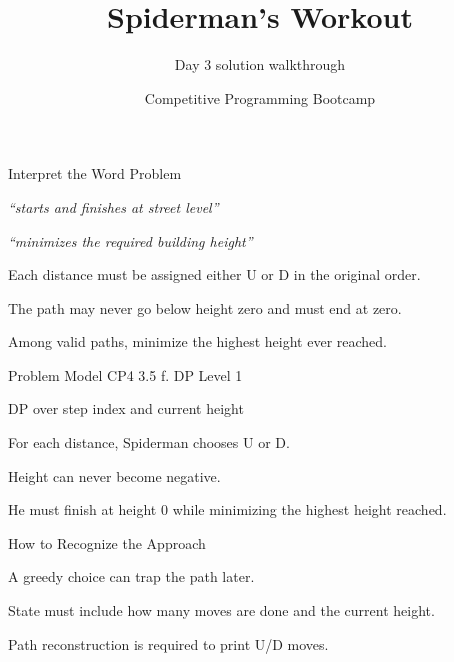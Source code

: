\documentclass[aspectratio=169,11pt]{beamer}
\title[spiderman]{Spiderman's Workout}
\subtitle{Day 3 solution walkthrough}
\author[Solution Deck]{Competitive Programming Bootcamp}
\date{}
\begin{document}
\begin{frame}[plain]
  \titlepage
\end{frame}

\begin{frame}{Interpret the Word Problem}
\small
{}
\begin{tightitemize}
  \item \textit{``starts and finishes at street level''}
  \item \textit{``minimizes the required building height''}
\end{tightitemize}

\vspace{0.18cm}
\begin{tightitemize}
  \item Each distance must be assigned either U or D in the original order.
  \item The path may never go below height zero and must end at zero.
  \item Among valid paths, minimize the highest height ever reached.
\end{tightitemize}
\end{frame}







\begin{frame}{Problem Model}
\small
{} CP4 3.5 f. DP Level 1

\vspace{0.25cm}
 DP over step index and current height

\vspace{0.25cm}
\begin{tightitemize}
  \item For each distance, Spiderman chooses U or D.
  \item Height can never become negative.
  \item He must finish at height 0 while minimizing the highest height reached.
\end{tightitemize}
\end{frame}

\begin{frame}{How to Recognize the Approach}
\begin{tightitemize}
  \item A greedy choice can trap the path later.
  \item State must include how many moves are done and the current height.
  \item Path reconstruction is required to print U/D moves.
\end{tightitemize}
\end{frame}
\end{document}
